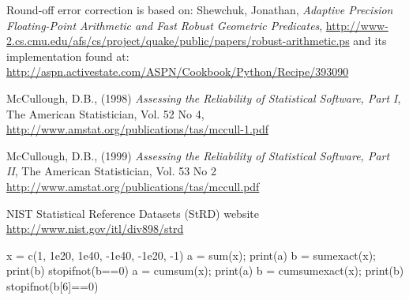 \begin{References}\relax
Round-off error correction is based on:
Shewchuk, Jonathan, \emph{Adaptive Precision Floating-Point Arithmetic and  
Fast Robust Geometric Predicates},  
\url{http://www-2.cs.cmu.edu/afs/cs/project/quake/public/papers/robust-arithmetic.ps}
and its implementation found at:
\url{http://aspn.activestate.com/ASPN/Cookbook/Python/Recipe/393090} 

McCullough, D.B., (1998) \emph{Assessing the Reliability of Statistical 
Software, Part I}, The American Statistician, Vol. 52 No 4, 
\url{http://www.amstat.org/publications/tas/mccull-1.pdf}

McCullough, D.B., (1999) \emph{Assessing the Reliability of Statistical 
Software, Part II}, The American Statistician, Vol. 53 No 2
\url{http://www.amstat.org/publications/tas/mccull.pdf}

NIST Statistical Reference Datasets (StRD) website 
\url{http://www.nist.gov/itl/div898/strd}
\end{References}
\begin{SeeAlso}\relax
{}
\end{SeeAlso}
\begin{Examples}
\begin{ExampleCode}
  x = c(1, 1e20, 1e40, -1e40, -1e20, -1)
  a = sum(x);         print(a)
  b = sumexact(x);    print(b)
  stopifnot(b==0)
  a = cumsum(x);      print(a)
  b = cumsumexact(x); print(b)
  stopifnot(b[6]==0)
\end{ExampleCode}
\end{Examples}

